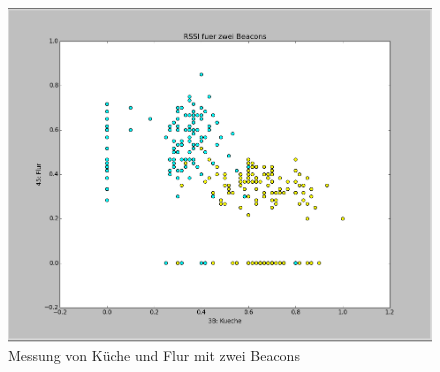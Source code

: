 \begin{figure}[tbh]
\centering
\includegraphics[width=1.0\linewidth]{Bilder/Messungen/KuecheFlur_1}
\caption{Messung von Küche und Flur mit zwei Beacons}
\label{fig:KuecheFlur_1}
\end{figure}
